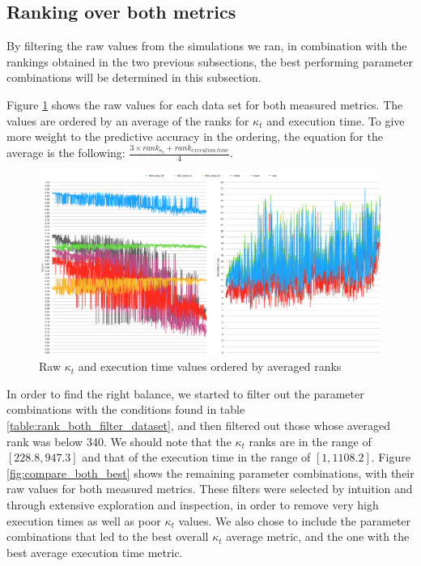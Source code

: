 \subsection{Ranking over both metrics}

By filtering the raw values from the simulations we ran, in combination with the rankings obtained in the two previous subsections, the best performing parameter combinations will be determined in this subsection.

Figure \ref{fig:rank_both_all} shows the raw values for each data set for both measured metrics. The values are ordered by an average of the ranks for $\kappa_t$ and execution time. To give more weight to the predictive accuracy in the ordering, the equation for the average is the following: $\frac{3\times rank_{\kappa_t}+rank_{execution\ time}}{4}$.

\begin{figure}
  \includegraphics[width=\linewidth]{./images/chapter5/rank_both}
\caption{\label{fig:rank_both_all}Raw $\kappa_t$ and execution time values ordered by averaged ranks}
\end{figure}

In order to find the right balance, we started to filter out the parameter combinations with the conditions found in table \ref{table:rank_both_filter_dataset}, and then filtered out those whose averaged rank was below 340. We should note that the $\kappa_t$ ranks are in the range of $[228.8, 947.3]$ and that of the execution time in the range of $[1, 1108.2]$. Figure \ref{fig:compare_both_best} shows the remaining parameter combinations, with their raw values for both measured metrics. These filters were selected by intuition and through extensive exploration and inspection, in order to remove very high execution times as well as poor $\kappa_t$ values. We also chose to include the parameter combinations that led to the best overall $\kappa_t$ average metric, and the one with the best average execution time metric.

